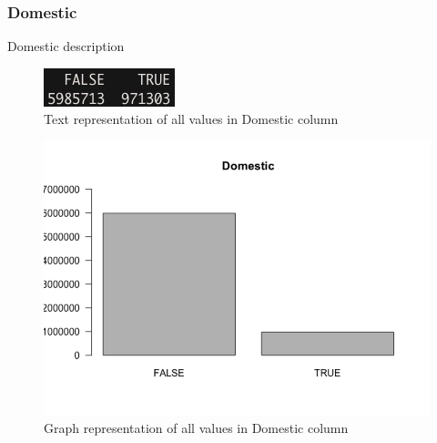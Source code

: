 \newpage
\subsubsection{Domestic}
Domestic description
\begin{figure}[H]
\includegraphics{images/EDA/Domestic.jpg}
\centering
\caption{Text representation of all values in Domestic column}
\end{figure}
\begin{figure}[H]
\includegraphics[scale=0.7]{images/EDA/Domestic.png}
\centering
\caption{Graph representation of all values in Domestic column}
\end{figure}